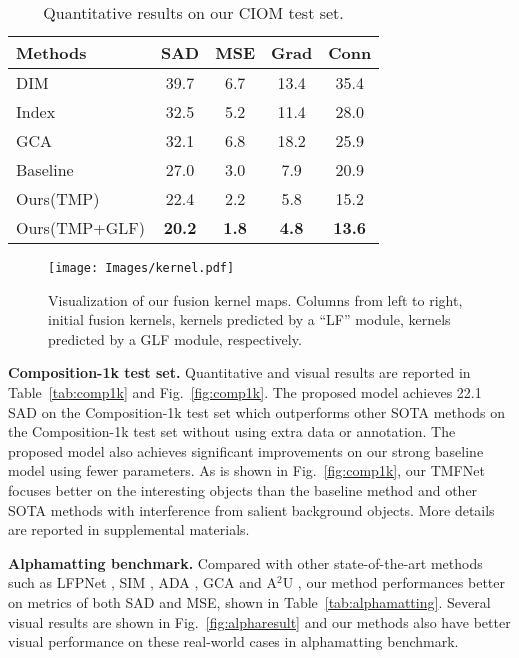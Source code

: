\documentclass[10pt,twocolumn,letterpaper]{article}
\begin{document}
\begin{table}[h]
    \begin{center}
    \caption{Quantitative results on our CIOM test set.}
    \begin{tabular}{l|cccc}
        \hline
        Methods & SAD & MSE  & Grad & Conn \\
        \hline
        DIM \cite{deepmatting}          & 39.7 & 6.7 & 13.4 & 35.4 \\
        Index \cite{indexnet}           & 32.5 & 5.2 & 11.4 & 28.0 \\
        GCA  \cite{gca}       & 32.1 & 6.8 & 18.2 & 25.9 \\
        \hline
        Baseline & 27.0 & 3.0 & 7.9 & 20.9 \\
        Ours(TMP) & 22.4 & 2.2 & 5.8 & 15.2 \\
       Ours(TMP+GLF) & \textbf{20.2} & \textbf{1.8} & \textbf{4.8} & \textbf{13.6} \\
        \hline
    \end{tabular}

    \label{tab:ciom}
    \end{center}
\end{table}
\begin{figure}[t]
		\centering
		\texttt{[image: Images/kernel.pdf]}
		\caption{ Visualization of our fusion kernel maps. Columns from left to right, initial fusion kernels, kernels predicted by a ``LF'' module,   kernels predicted by a GLF module, respectively.}
		\label{fig:kernel}
\end{figure}

\textbf{Composition-1k test set.} Quantitative and visual results are reported in Table~\ref{tab:comp1k} and Fig.~\ref{fig:comp1k}. The proposed model achieves 22.1 SAD on the Composition-1k test set which outperforms other SOTA methods on the Composition-1k test set without using extra data or annotation. The proposed model also achieves significant improvements on our strong baseline model using fewer parameters. As is shown in Fig.~\ref{fig:comp1k}, our TMFNet  focuses better on the interesting objects than the baseline method and other SOTA methods \cite{gca,indexnet} with interference from salient background objects. More details are reported in supplemental materials.

\textbf{Alphamatting benchmark.} Compared with other state-of-the-art methods such as LFPNet \cite{lfpnet}, SIM \cite{sim}, ADA \cite{adamatting}, GCA \cite{gca} and A$^2$U \cite{a2u}, our method performances better on metrics of both SAD and MSE, shown in Table~\ref{tab:alphamatting}. Several visual results are shown in Fig.~\ref{fig:alpharesult} and our methods also have better visual performance on these real-world cases in alphamatting \cite{alphamatting} benchmark.
\end{document}
